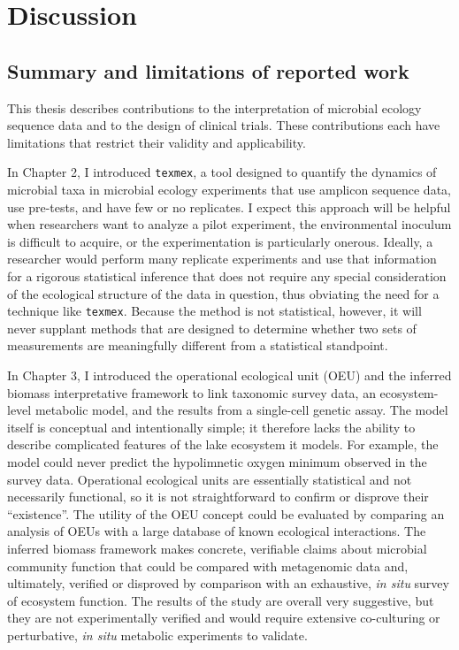 \chapter{Discussion}

\section{Summary and limitations of reported work}
This thesis describes contributions to the interpretation of microbial
ecology sequence data and to the design of clinical trials. These contributions
each have limitations that restrict their validity and applicability.

In Chapter 2, I introduced \texttt{texmex}, a tool designed to quantify the dynamics of
microbial taxa in microbial ecology experiments that use amplicon sequence
data, use pre-tests, and have few or no replicates. I expect this approach
will be helpful when researchers want to analyze a pilot experiment, the
environmental inoculum is difficult to acquire, or the experimentation is
particularly onerous. Ideally, a researcher would perform many replicate
experiments and use that information for a rigorous statistical inference that
does not require any special consideration of the ecological structure of the
data in question, thus obviating the need for a technique like \texttt{texmex}.
Because the method is not statistical, however, it will never supplant
methods that are designed to determine whether two sets of measurements are
meaningfully different from a statistical standpoint.

In Chapter 3, I introduced the operational ecological unit (OEU) and
the inferred biomass interpretative framework to link taxonomic survey data, an
ecosystem-level metabolic model, and the results from a single-cell genetic
assay. The model itself is conceptual and intentionally simple; it therefore
lacks the ability to describe complicated features of the lake
ecosystem it models. For example, the model could never predict the
hypolimnetic oxygen minimum observed in the survey data. Operational
ecological units are essentially statistical and not necessarily functional,
so it is not straightforward to confirm or disprove their ``existence''. The
utility of the OEU concept could be evaluated by comparing an analysis of OEUs
with a large database of known ecological interactions. The inferred biomass
framework makes concrete, verifiable claims about microbial community function
that could be compared with metagenomic data and, ultimately, verified or
disproved by comparison with an exhaustive, \textit{in situ} survey of
ecosystem function. The results of the study are overall very suggestive, but
they are not experimentally verified and would require extensive co-culturing
or perturbative, \textit{in situ} metabolic experiments to validate.

